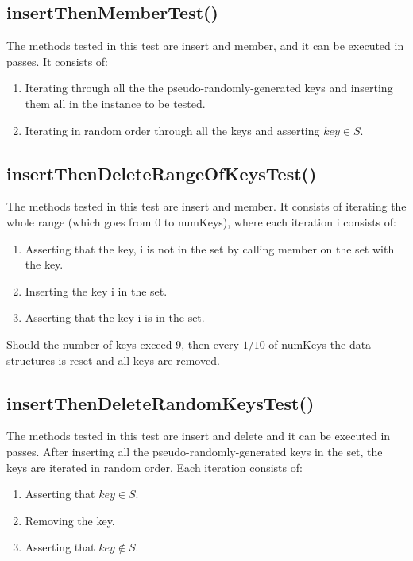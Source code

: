 \subsection{{\ttfamily insertThenMemberTest()}}

The methods tested in this test are {\ttfamily insert} and {\ttfamily member}, and it can be executed in passes. It consists of:
\begin{enumerate}
    \item
    Iterating through all the the pseudo-randomly-generated keys and inserting them all in the instance to be tested.
    \item
    Iterating in random order through all the keys and asserting $key \in S$.
\end{enumerate}

\subsection{{\ttfamily insertThenDeleteRangeOfKeysTest()}}

The methods tested in this test are {\ttfamily insert} and {\ttfamily member}. It consists of iterating the whole range (which goes from $0$ to {\ttfamily numKeys}), where each iteration {\ttfamily i} consists of:
\begin{enumerate}
    \item
    Asserting that the key, {\ttfamily i} is not in the set by calling {\ttfamily member} on the set with the key.
    \item
    Inserting the key {\ttfamily i} in the set.
    \item
    Asserting that the key {\ttfamily i} is in the set.
\end{enumerate}
Should the number of keys exceed 9, then every $1/10$ of {\ttfamily numKeys} the data structures is reset and all keys are removed.

\subsection{{\ttfamily insertThenDeleteRandomKeysTest()}}

The methods tested in this test are {\ttfamily insert} and {\ttfamily delete} and it can be executed in passes. After inserting all the pseudo-randomly-generated keys in the set, the keys are iterated in random order. Each iteration consists of:
\begin{enumerate}
    \item Asserting that $key \in S$.
    \item Removing the key.
    \item Asserting that $key \not\in S$.
\end{enumerate}


